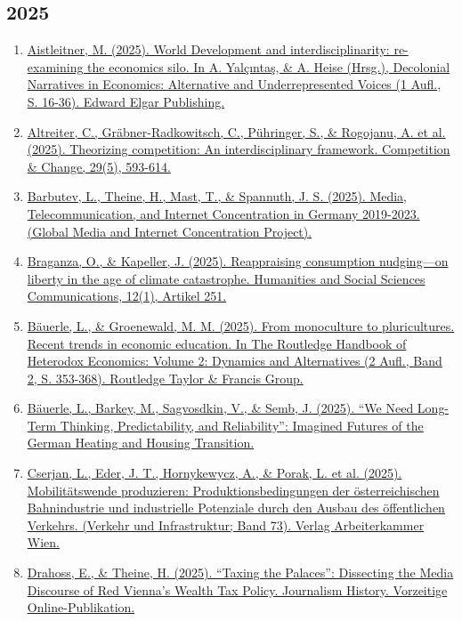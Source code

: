 \subsection*{2025}
\begin{enumerate}
	 \item \href{https://doi.org/10.4337/9781035329649.00010}{Aistleitner, M. (2025). World Development and interdisciplinarity: re-examining the economics silo. In A. Yalçıntaş, \& A. Heise (Hrsg.), Decolonial Narratives in Economics: Alternative and Underrepresented Voices (1 Aufl., S. 16-36). Edward Elgar Publishing.}
	 \item \href{https://doi.org/10.1177/10245294251330343}{Altreiter, C., Gräbner-Radkowitsch, C., Pühringer, S., \& Rogojanu, A. et al. (2025). Theorizing competition: An interdisciplinary framework. Competition \& Change, 29(5), 593-614.}
	 \item \href{https://doi.org/10.22215/gmicp/2025.12.276}{Barbutev, L., Theine, H., Mast, T., \& Spannuth, J. S. (2025). Media, Telecommunication, and Internet Concentration in Germany 2019-2023. (Global Media and Internet Concentration Project).}
	 \item \href{https://doi.org/10.1057/s41599-024-04246-0}{Braganza, O., \& Kapeller, J. (2025). Reappraising consumption nudging—on liberty in the age of climate catastrophe. Humanities and Social Sciences Communications, 12(1), Artikel 251.}
	 \item \href{https://doi.org/10.4324/9781003687054-28}{Bäuerle, L., \& Groenewald, M. M. (2025). From monoculture to pluricultures. Recent trends in economic education. In The Routledge Handbook of Heterodox Economics: Volume 2: Dynamics and Alternatives (2 Aufl., Band 2, S. 353-368). Routledge Taylor \& Francis Group.}
	 \item \href{https://doi.org/10.2139/ssrn.5180335}{Bäuerle, L., Barkey, M., Sagvosdkin, V., \& Semb, J. (2025). “We Need Long-Term Thinking, Predictability, and Reliability”: Imagined Futures of the German Heating and Housing Transition.}
	 \item \href{https://wien.arbeiterkammer.at/interessenvertretung/umweltundverkehr/verkehr/unsere-bahnen/Mobilitaetswende_produzieren.pdf}{Cserjan, L., Eder, J. T., Hornykewycz, A., \& Porak, L. et al. (2025). Mobilitätswende produzieren: Produktionsbedingungen der österreichischen Bahnindustrie und industrielle Potenziale durch den Ausbau des öffentlichen Verkehrs. (Verkehr und Infrastruktur; Band 73). Verlag Arbeiterkammer Wien.}
	 \item \href{https://doi.org/10.1080/00947679.2025.2540342}{Drahoss, E., \& Theine, H. (2025). “Taxing the Palaces”: Dissecting the Media Discourse of Red Vienna’s Wealth Tax Policy. Journalism History. Vorzeitige Online-Publikation.}

\end{enumerate}
